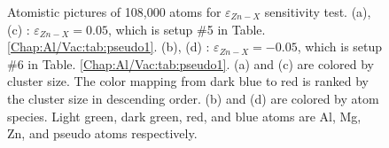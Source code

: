 \begin{figure}[!ht]
\caption[Atomistic pictures of 108,000 atoms for $\varepsilon_{Zn-X}$ sensitivity test.]{Atomistic pictures of 108,000 atoms for $\varepsilon_{Zn-X}$ sensitivity test. (a), (c) : $\varepsilon_{Zn-X} = 0.05$, which is setup \#5 in Table. \ref{Chap:Al/Vac:tab:pseudo1}. (b), (d) : $\varepsilon_{Zn-X} = -0.05$, which is setup \#6 in Table. \ref{Chap:Al/Vac:tab:pseudo1}. (a) and (c) are colored by cluster size. The color mapping from dark blue to red is ranked by the cluster size in descending order. (b) and (d) are colored by atom species. Light green, dark green, red, and blue atoms are Al, Mg, Zn, and pseudo atoms respectively.}
\label{Chap:Al/Vac:fig:sens_Zn}
\end{figure}
\endgroup